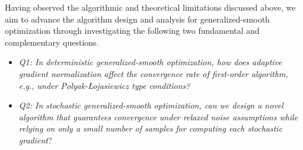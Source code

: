 \documentclass[10pt]{article} %
\begin{document}
Having observed the algorithmic and theoretical limitations discussed above, we aim to advance the algorithm design and analysis for generalized-smooth optimization through investigating the following two fundamental and complementary questions. 
\begin{itemize}[leftmargin = *]
    \item \textit{Q1: In deterministic generalized-smooth optimization, how does adaptive gradient normalization affect the convergence rate of first-order algorithm, e.g., under Polyak-{\L}ojasiewicz type conditions?
    }
    \item \textit{Q2: In stochastic generalized-smooth optimization, can we design a novel algorithm that guarantees convergence under relaxed noise assumptions while relying on only a small number of samples for computing each stochastic gradient}?
    
\end{itemize}


\end{document}
